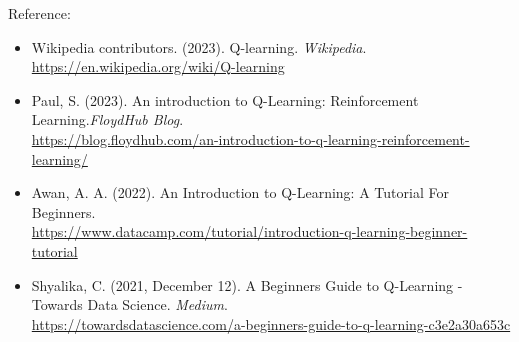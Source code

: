 \documentclass{article}
\begin{document}
 
 \newpage
 Reference:
\begin{itemize}
\item Wikipedia contributors. (2023). Q-learning. \emph{Wikipedia}.\\
 \url{https://en.wikipedia.org/wiki/Q-learning}
\item Paul, S. (2023). An introduction to Q-Learning: Reinforcement Learning.\emph{FloydHub Blog}. \\
\url{https://blog.floydhub.com/an-introduction-to-q-learning-reinforcement-learning/}
\item Awan, A. A. (2022). An Introduction to Q-Learning: A Tutorial For Beginners. \\
\url{https://www.datacamp.com/tutorial/introduction-q-learning-beginner-tutorial}
\item Shyalika, C. (2021, December 12). A Beginners Guide to Q-Learning - Towards Data Science. \emph{Medium}. \\
\url{https://towardsdatascience.com/a-beginners-guide-to-q-learning-c3e2a30a653c}
\end{itemize}
 
 
 
 
 
 
 
 
\end{document}
